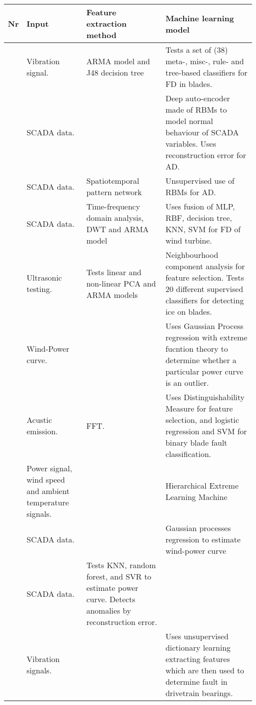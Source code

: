 \begin{longtable}{p{}p{}p{}p{}}
    \hline
    Nr & Input & Feature extraction method & Machine learning model \\
    \hline \hline
    \cite{ml_cm_wt_blade_ARMA_2018} & Vibration signal. & ARMA model and J48 decision tree & Tests a set of (38) meta-, misc-, rule- and tree-based classifiers for FD in blades. \\  \hline
    \cite{AD_and_fault_analysis_wt_DAE} & SCADA data. & & Deep auto-encoder made of RBMs to model normal behaviour of SCADA variables. Uses reconstruction error for AD. \\ \hline
    \cite{unsup_graphical_modeling_wt_cm} & SCADA data. & Spatiotemporal pattern network & Unsupervised use of RBMs for AD. \\ \hline
    \cite{fault_detection_and_isolation_using_classifier_fusion} & SCADA data. & Time-frequency domain analysis, DWT and ARMA model & Uses fusion of MLP, RBF, decision tree, KNN, SVM for FD of wind turbine.  \\ \hline
    \cite{lin_and_non_lin_feat_for_ice_detection_on_blades} & Ultrasonic testing. & Tests linear and non-linear PCA and ARMA models & Neighbourhood component analysis for feature selection. Tests 20 different supervised classifiers for detecting ice on blades. \\ \hline
    \cite{perf_mon_of_wt_using_extreme_func_theory} & Wind-Power curve. &  & Uses Gaussian Process regression with extreme fucntion theory to determine whether a particular power curve is an outlier.\\ \hline
    \cite{blade_damage_detection_sup_ml_alg} & Acustic emission. & FFT. & Uses Distinguishability Measure for feature selection, and logistic regression and SVM for binary blade fault classification. \\ \hline
    \cite{wt_cm_using_cloud_computing_and_HELM} & Power signal, wind speed and ambient temperature signals. & & Hierarchical Extreme Learning Machine\\ \hline
    \cite{GP_operational_curve_monitoring} & SCADA data. & & Gaussian processes regression to estimate wind-power curve \\ \hline
    \cite{high_freq_scada_perf_monit_sensitivity} & SCADA data. & Tests KNN, random forest, and SVR to estimate power curve. Detects anomalies by reconstruction error.& \\ \hline
    \cite{dict_learning_monitor_wt_drivetrain_bearing} & Vibration signals. & & Uses unsupervised dictionary learning extracting features which are then used to determine fault in drivetrain bearings. \\ \hline

\end{longtable}
